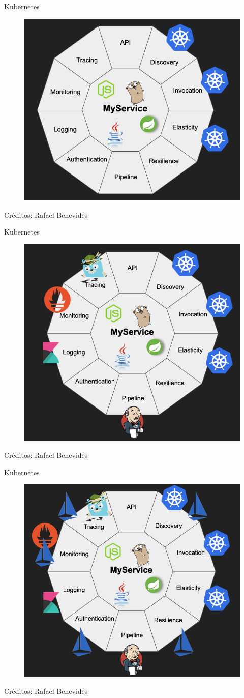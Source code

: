 \documentclass[aspectratio=169]{beamer}
\begin{document}
\begin{frame}{Kubernetes}
    \begin{figure}
        \centering
        \includegraphics[width=0.5\linewidth]{Images/kube1.png}
        \label{fig:contain9er}
    \end{figure}
    
    Créditos: Rafael Benevides
\end{frame}


\begin{frame}{Kubernetes}
    \begin{figure}
        \centering
        \includegraphics[width=0.5\linewidth]{Images/kube2.png}
        \label{fig:contain10er}
    \end{figure}
    
    Créditos: Rafael Benevides
\end{frame}


\begin{frame}{Kubernetes}
    \begin{figure}
        \centering
        \includegraphics[width=0.5\linewidth]{Images/kube3.png}
        \label{fig:containe11r}
    \end{figure}
    
    Créditos: Rafael Benevides
\end{frame}
\end{document}
